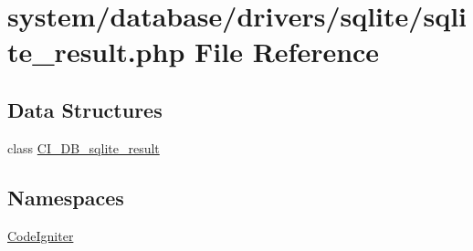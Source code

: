 \hypertarget{sqlite__result_8php}{\section{system/database/drivers/sqlite/sqlite\-\_\-result.php File Reference}
\label{sqlite__result_8php}
}
\subsection*{Data Structures}
\begin{DoxyCompactItemize}
\item 
class \hyperlink{class_c_i___d_b__sqlite__result}{C\-I\-\_\-\-D\-B\-\_\-sqlite\-\_\-result}
\end{DoxyCompactItemize}
\subsection*{Namespaces}
\begin{DoxyCompactItemize}
\item 
\hyperlink{namespace_code_igniter}{Code\-Igniter}
\end{DoxyCompactItemize}
